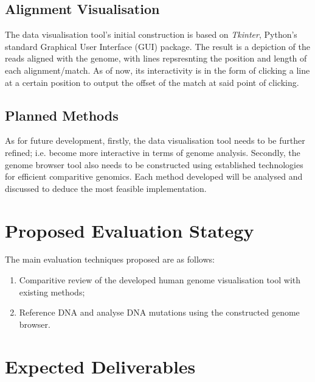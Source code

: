 \documentclass{csfyp}
\begin{document}
\subsection{Alignment Visualisation}
The data visualisation tool's initial construction is based on {\textit{Tkinter}}, Python's standard Graphical User Interface (GUI) package.  The result is a depiction of the reads aligned with the genome, with lines repsresnting the position and length of each alignment/match.  As of now, its interactivity is in the form of clicking a line at a certain position to output the offset of the match at said point of clicking.     

\subsection{Planned Methods}
As for future development, firstly, the data visualisation tool needs to be further refined; i.e. become more interactive in terms of genome analysis.  Secondly, the genome browser tool also needs to be constructed using established technologies for efficient comparitive genomics.  Each method developed will be analysed and discussed to deduce the most feasible implementation.   


\section{Proposed Evaluation Stategy}

The main evaluation techniques proposed are as follows:

\begin{enumerate}[nolistsep]

  \item Comparitive review of the developed human genome visualisation tool with existing methods;

  \item Reference DNA and analyse DNA mutations using the constructed genome browser.

\end{enumerate}


\section{Expected Deliverables}
\end{document}
